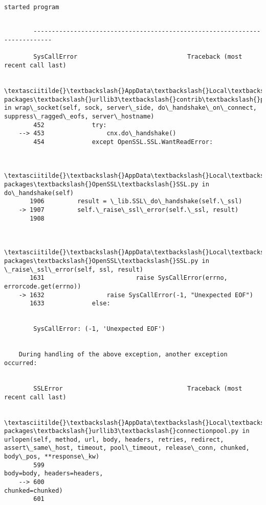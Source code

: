 \documentclass[11pt]{article}
\begin{document}
    \begin{Verbatim}[commandchars=\\\{\}]
started program
\end{Verbatim}

    \begin{Verbatim}[commandchars=\\\{\}]

        ---------------------------------------------------------------------------

        SysCallError                              Traceback (most recent call last)

        \textasciitilde{}\textbackslash{}AppData\textbackslash{}Local\textbackslash{}Continuum\textbackslash{}anaconda3\textbackslash{}lib\textbackslash{}site-packages\textbackslash{}urllib3\textbackslash{}contrib\textbackslash{}pyopenssl.py in wrap\_socket(self, sock, server\_side, do\_handshake\_on\_connect, suppress\_ragged\_eofs, server\_hostname)
        452             try:
    --> 453                 cnx.do\_handshake()
        454             except OpenSSL.SSL.WantReadError:
    

        \textasciitilde{}\textbackslash{}AppData\textbackslash{}Local\textbackslash{}Continuum\textbackslash{}anaconda3\textbackslash{}lib\textbackslash{}site-packages\textbackslash{}OpenSSL\textbackslash{}SSL.py in do\_handshake(self)
       1906         result = \_lib.SSL\_do\_handshake(self.\_ssl)
    -> 1907         self.\_raise\_ssl\_error(self.\_ssl, result)
       1908 
    

        \textasciitilde{}\textbackslash{}AppData\textbackslash{}Local\textbackslash{}Continuum\textbackslash{}anaconda3\textbackslash{}lib\textbackslash{}site-packages\textbackslash{}OpenSSL\textbackslash{}SSL.py in \_raise\_ssl\_error(self, ssl, result)
       1631                         raise SysCallError(errno, errorcode.get(errno))
    -> 1632                 raise SysCallError(-1, "Unexpected EOF")
       1633             else:
    

        SysCallError: (-1, 'Unexpected EOF')

        
    During handling of the above exception, another exception occurred:
    

        SSLError                                  Traceback (most recent call last)

        \textasciitilde{}\textbackslash{}AppData\textbackslash{}Local\textbackslash{}Continuum\textbackslash{}anaconda3\textbackslash{}lib\textbackslash{}site-packages\textbackslash{}urllib3\textbackslash{}connectionpool.py in urlopen(self, method, url, body, headers, retries, redirect, assert\_same\_host, timeout, pool\_timeout, release\_conn, chunked, body\_pos, **response\_kw)
        599                                                   body=body, headers=headers,
    --> 600                                                   chunked=chunked)
        601 
    


\end{Verbatim}
\end{document}

